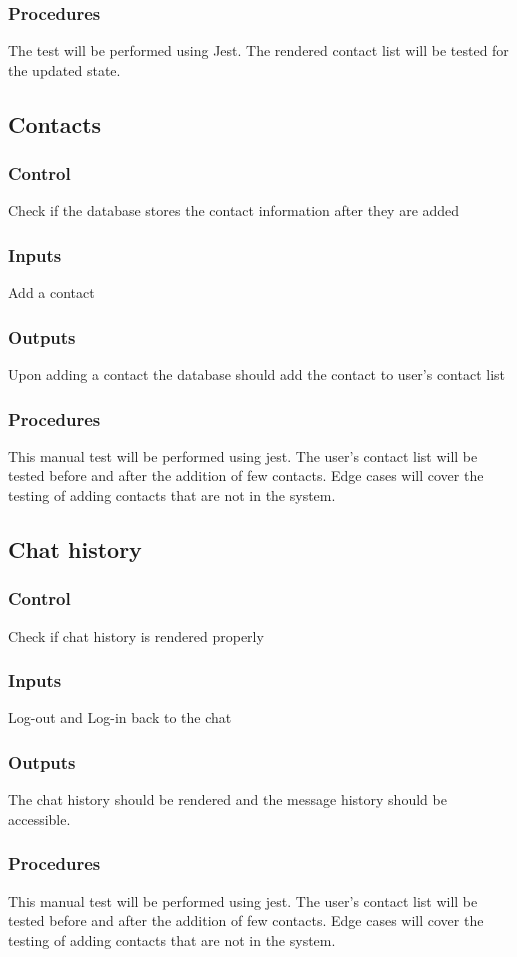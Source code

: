 \documentclass[12pt, titlepage]{article}
\begin{document}
\subsubsection{Procedures}
The test will  be performed using Jest. The rendered contact list will be tested for the updated state.
\subsection{Contacts}
\subsubsection{Control}
Check if the database stores the contact information after they are added
\subsubsection{Inputs}
Add a contact
\subsubsection{Outputs}
Upon adding a contact the database should add the contact to user's contact list
\subsubsection{Procedures}
This manual test will be performed using jest. The user's contact list will be tested before and after the addition of few contacts. Edge cases will cover the testing of adding contacts that are not in the system.
\subsection{Chat history}
\subsubsection{Control}
Check if chat history is rendered properly
\subsubsection{Inputs}
Log-out and Log-in back to the chat
\subsubsection{Outputs}
The chat history should be rendered and the message history should be accessible.
\subsubsection{Procedures}
This manual test will be performed using jest. The user's contact list will be tested before and after the addition of few contacts. Edge cases will cover the testing of adding contacts that are not in the system.
\end{document}
